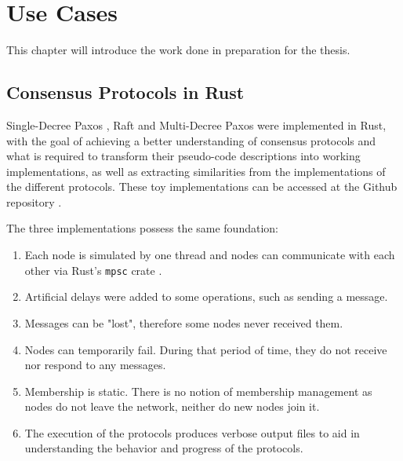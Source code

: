

\chapter{Use Cases}
\label{cha:use_cases}

This chapter will introduce the work done in preparation for the thesis.

\section{Consensus Protocols in Rust}

Single-Decree Paxos \cite{paxos_made_simple}, Raft \cite{raft} \cite{paxos_vs_raft} and Multi-Decree Paxos \cite{paxos_live} \cite{paxos_vs_raft} were implemented in Rust, with the goal of achieving a better understanding of consensus protocols and what is required to transform their pseudo-code descriptions into working implementations, as well as extracting similarities from the implementations of the different protocols. These toy implementations can be accessed at the Github repository \cite{my_github}.

The three implementations possess the same foundation:

\begin{enumerate}
  \item Each node is simulated by one thread and nodes can communicate with each other via Rust's \texttt{mpsc} crate \cite{mpsc_rust}.
  \item Artificial delays were added to some operations, such as sending a message.
  \item Messages can be "lost", therefore some nodes never received them.
  \item Nodes can temporarily fail. During that period of time, they do not receive nor respond to any messages.
  \item Membership is static. There is no notion of membership management as nodes do not leave the network, neither do new nodes join it.
  \item The execution of the protocols produces verbose output files to aid in understanding the behavior and progress of the protocols.
\end{enumerate}


